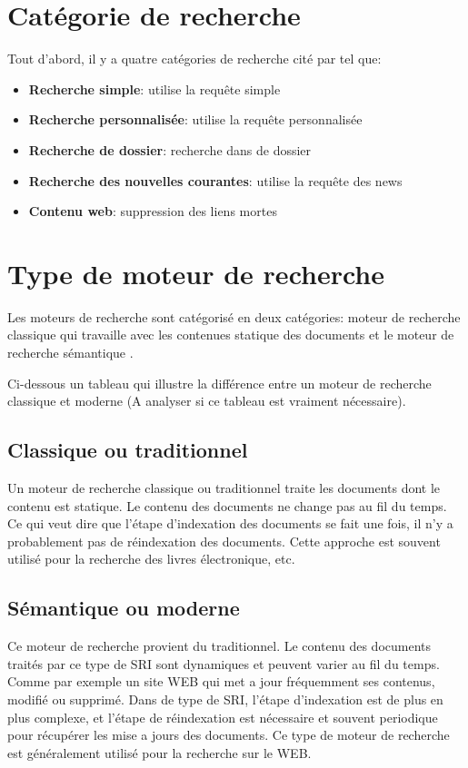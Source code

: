 \section{Catégorie de recherche}
Tout d'abord, il y a quatre catégories de recherche cité par \citeauthor{ir-on-web} \citep{ir-on-web} tel que:
\begin{itemize}
	\item \textbf{Recherche simple}: utilise la requête simple
	\item \textbf{Recherche personnalisée}: utilise la requête personnalisée
	\item \textbf{Recherche de dossier}: recherche dans de dossier
	\item \textbf{Recherche des nouvelles courantes}: utilise la requête des news
	\item \textbf{Contenu web}: suppression des liens mortes
\end{itemize}

\section{Type de moteur de recherche}
Les moteurs de recherche sont catégorisé en deux catégories: moteur de recherche classique qui travaille avec les contenues statique des documents et le moteur de recherche sémantique \citep*{approche-semantique,thesaurus-ir-web}.

Ci-dessous un tableau qui illustre la différence entre un moteur de recherche classique et moderne \citep{ir-on-web} (A analyser si ce tableau est vraiment nécessaire).

\subsection{Classique ou traditionnel}
Un moteur de recherche classique ou traditionnel traite les documents dont le contenu est statique. Le contenu des documents ne change pas au fil du temps. Ce qui veut dire que l'étape d'indexation des documents se fait une fois, il n'y a probablement pas de réindexation des documents. Cette approche est souvent utilisé pour la recherche des livres électronique, etc.

\subsection{Sémantique ou moderne}
Ce moteur de recherche provient du traditionnel. Le contenu des documents traités par ce type de SRI sont dynamiques et peuvent varier au fil du temps. Comme par exemple un site WEB qui met a jour fréquemment ses contenus, modifié ou supprimé. Dans de type de SRI, l'étape d'indexation est de plus en plus complexe, et l'étape de réindexation est nécessaire et souvent periodique pour récupérer les mise a jours des documents. Ce type de moteur de recherche est généralement utilisé pour la recherche sur le WEB.


